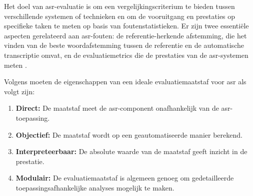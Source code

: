 Het doel van \gls{asr}-evaluatie is om een vergelijkingscriterium te bieden tussen verschillende systemen of technieken en om de vooruitgang en prestaties op specifieke taken te meten op basis van foutenstatistieken. Er zijn twee essentiële aspecten gerelateerd aan \gls{asr}-fouten: de referentie-herkende afstemming, die het vinden van de beste woordafstemming tussen de referentie en de automatische transcriptie omvat, en de evaluatiemetrics die de prestaties van de \gls{asr}-systemen meten \autocite{McCowan2004}.


Volgens \textcite{McCowan2004} moeten de eigenschappen van een ideale evaluatiemaatstaf voor \gls{asr} als volgt zijn:
\begin{enumerate}[label=\arabic*.]
 \item \textbf{Direct:} De maatstaf meet de \gls{asr}-component onafhankelijk van de \gls{asr}-toepassing.
 
 \item \textbf{Objectief:} De maatstaf wordt op een geautomatiseerde manier berekend.
 
 \item \textbf{Interpreteerbaar:} De absolute waarde van de maatstaf geeft inzicht in de prestatie.
 
 \item \textbf{Modulair:} De evaluatiemaatstaf is algemeen genoeg om gedetailleerde toepassingsafhankelijke analyses mogelijk te maken.
\end{enumerate} 

